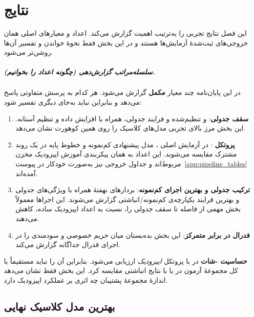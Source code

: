 \chapter{نتایج}
\label{ch:results}

این فصل نتایج تجربی را به‌ترتیب اهمیت گزارش می‌کند. اعداد و معیارهای اصلی همان خروجی‌های ثبت‌شدۀ آزمایش‌ها هستند و در این بخش فقط نحوۀ خواندن و تفسیر آن‌ها روشن‌تر می‌شود.

\paragraph{سلسله‌مراتب گزارش‌دهی (چگونه اعداد را بخوانیم).}
در این پایان‌نامه چند معیار \textbf{مکمل} گزارش می‌شود. هر کدام به پرسش متفاوتی پاسخ می‌دهد و بنابراین نباید به‌جای دیگری تفسیر شود:
\begin{enumerate}[leftmargin=2em]
  \item \textbf{سقف جدولی}:  و  تنظیم‌شده و فرایند  جدولی، همراه با افزایش داده و تنظیم آستانه. این بخش مرز بالای تجربی مدل‌های کلاسیک را روی همین کوهورت نشان می‌دهد.
  \item \textbf{پروتکل }: در آزمایش اصلی ، مدل پیشنهادی کم‌نمونه و خطوط پایه در یک روند مشترک مقایسه می‌شوند. این اعداد به همان پیکربندی آموزش اپیزودیک مخزن مربوط‌اند و جداول خروجی نیز به‌صورت خودکار در پیوست~\ref{app:pipeline_tables} آمده‌اند.
  \item \textbf{ترکیب جدولی و بهترین اجرای کم‌نمونه}: بردارهای نهفتۀ  همراه با ویژگی‌های جدولی و بهترین فرایند یکپارچه‌ی کم‌نمونه/انباشتی گزارش می‌شوند. این اجراها معمولاً بخش مهمی از فاصله تا سقف جدولی را، نسبت به اعداد اپیزودیک ساده، کاهش می‌دهند.
  \item \textbf{فدرال در برابر متمرکز}: این بخش بده‌بستان میان حریم خصوصی و سودمندی را در اجرای فدرال جداگانه گزارش می‌کند.
\end{enumerate}
\textbf{حساسیت -شات} در  با پروتکل \emph{اپیزودیک} ارزیابی می‌شود. بنابراین  آن را نباید مستقیماً با  کل مجموعۀ آزمون در  یا با نتایج انباشتی مقایسه کرد. این بخش فقط نشان می‌دهد اندازۀ مجموعۀ پشتیبان چه اثری بر عملکرد اپیزودیک دارد.

\section{بهترین مدل کلاسیک نهایی}

